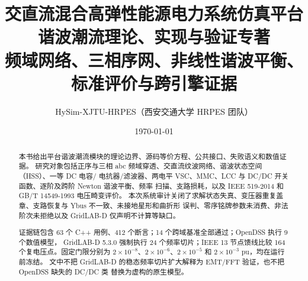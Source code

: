 \documentclass[UTF8,fontset=fandol,a4paper,11pt]{ctexart}
\title{\textbf{交直流混合高弹性能源电力系统仿真平台}\\[0.5em]
       {\Large 谐波潮流理论、实现与验证专著}\\[0.3em]
       {\large 频域网络、三相序网、非线性谐波平衡、标准评价与跨引擎证据}}
\author{HySim-XJTU-HRPES（西安交通大学 HRPES 团队）}
\date{\today}
\begin{document}
\maketitle
\begin{abstract}
本书给出平台谐波潮流模块的理论边界、源码等价方程、公共接口、失败语义和数值证据。
研究对象包括正序与三相 abc 频域穿透、交直流纹波网络、谐波状态空间（HSS）、一等 DC 电容/
电抗器/滤波器、两电平 VSC、MMC、LCC 与 DC/DC 开关函数、逐阶及跨阶 Newton 谐波平衡、频率
扫描、支路损耗，以及 IEEE 519-2014 和 GB/T 14549-1993 电压畸变评价。
本次系统审计关闭了求解状态失真、变压器重复盖章、支路恢复与 Ybus 不一致、未接地星形和曲折形
误判、零序铭牌参数未消费、非法阶次未拒绝以及 GridLAB-D 仅声明不计算等缺口。

证据链包含 63 个 C++ 用例、412 个断言；14 个跨域基准全部通过；OpenDSS 执行 9 个数值模型，
GridLAB-D 5.3.0 强制执行 24 个频率切片；IEEE 13 节点馈线比较 164 个复电压点。固定门限分别为
$2\times10^{-8}$、$2\times10^{-6}$、$2\times10^{-5}$ 和 $2\times10^{-3}$ pu，均在运行前冻结。
文中不把 GridLAB-D 的稳态频率切片扩大解释为 EMT/FFT 验证，也不把 OpenDSS 缺失的 DC/DC 类
替换为虚构的原生模型。
\end{abstract}

\tableofcontents
\newpage












\end{document}

